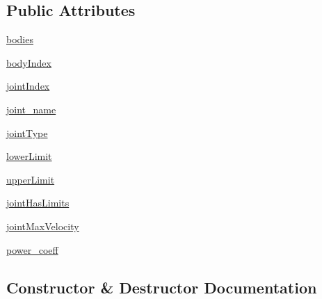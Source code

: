\subsection*{Public Attributes}
\begin{DoxyCompactItemize}
\item 
\hyperlink{classpybullet-gym_1_1pybulletgym_1_1envs_1_1mujoco_1_1robots_1_1robot__bases_1_1_joint_aa57be4597c5f06fd202650b626f6833d}{bodies}
\item 
\hyperlink{classpybullet-gym_1_1pybulletgym_1_1envs_1_1mujoco_1_1robots_1_1robot__bases_1_1_joint_afef5c0540141f799973341b141c7e31d}{body\+Index}
\item 
\hyperlink{classpybullet-gym_1_1pybulletgym_1_1envs_1_1mujoco_1_1robots_1_1robot__bases_1_1_joint_ae67e7e53cc9cd04c180c45b5fce2f6d1}{joint\+Index}
\item 
\hyperlink{classpybullet-gym_1_1pybulletgym_1_1envs_1_1mujoco_1_1robots_1_1robot__bases_1_1_joint_afb96c7dfff6af8c0d060fba1090304bb}{joint\+\_\+name}
\item 
\hyperlink{classpybullet-gym_1_1pybulletgym_1_1envs_1_1mujoco_1_1robots_1_1robot__bases_1_1_joint_a286ea9861134aba482afd74aa6d8eed0}{joint\+Type}
\item 
\hyperlink{classpybullet-gym_1_1pybulletgym_1_1envs_1_1mujoco_1_1robots_1_1robot__bases_1_1_joint_a1dc1b7d9d7341d6aa0a3342f3839fc5b}{lower\+Limit}
\item 
\hyperlink{classpybullet-gym_1_1pybulletgym_1_1envs_1_1mujoco_1_1robots_1_1robot__bases_1_1_joint_a9849646cee185459be95dbe4f0722359}{upper\+Limit}
\item 
\hyperlink{classpybullet-gym_1_1pybulletgym_1_1envs_1_1mujoco_1_1robots_1_1robot__bases_1_1_joint_a1c83118c3cda3d398bcd08425aaa1f29}{joint\+Has\+Limits}
\item 
\hyperlink{classpybullet-gym_1_1pybulletgym_1_1envs_1_1mujoco_1_1robots_1_1robot__bases_1_1_joint_aace93ef242e6f6e6f178c49dfe398a0b}{joint\+Max\+Velocity}
\item 
\hyperlink{classpybullet-gym_1_1pybulletgym_1_1envs_1_1mujoco_1_1robots_1_1robot__bases_1_1_joint_a3f1ad9acfe6882ec6dccf14f85c847d4}{power\+\_\+coeff}
\end{DoxyCompactItemize}


\subsection{Constructor \& Destructor Documentation}
